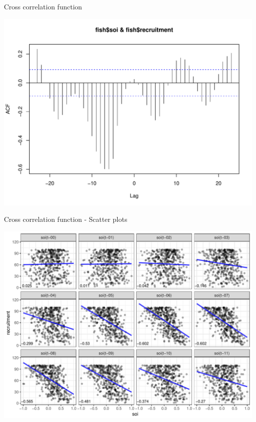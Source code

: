 \documentclass[11pt,ignorenonframetext,]{beamer}
\begin{document}
\begin{frame}{Cross correlation function}

\includegraphics{Lec7_files/figure-beamer/unnamed-chunk-5-1.pdf}

\end{frame}

\begin{frame}{Cross correlation function - Scatter plots}

\begin{center}\includegraphics{Lec7_files/figure-beamer/unnamed-chunk-6-1} \end{center}

\end{frame}
\end{document}
